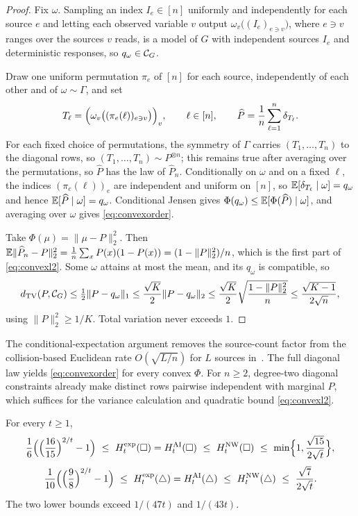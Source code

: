 \begin{proof}
Fix $\omega$. Sampling an index $I_e\in[n]$ uniformly and independently for each source $e$ and letting each observed variable $v$ output $\omega_v\bigl((I_e)_{e\ni v}\bigr)$, where $e\ni v$ ranges over the sources $v$ reads, is a model of $G$ with independent sources $I_e$ and deterministic responses, so $q_\omega\in\mathcal C_{G}$.

Draw one uniform permutation $\pi_e$ of $[n]$ for each source, independently of each other and of $\omega\sim\Gamma$, and set
\[
T_\ell=\Bigl(\omega_v\bigl((\pi_e(\ell))_{e\ni v}\bigr)\Bigr)_{v},\qquad \ell\in[n],
\qquad \widehat P=\frac1n\sum_{\ell=1}^n\delta_{T_\ell}.
\]
For each fixed choice of permutations, the symmetry of $\Gamma$ carries $(T_1,\dots,T_n)$ to the diagonal rows, so $(T_1,\dots,T_n)\sim P^{\otimes n}$; this remains true after averaging over the permutations, so $\widehat P$ has the law of $\widehat P_n$. Conditionally on $\omega$ and on a fixed $\ell$, the indices $(\pi_e(\ell))_e$ are independent and uniform on $[n]$, so $\mathbb E[\delta_{T_\ell}\mid\omega]=q_\omega$ and hence $\mathbb E[\widehat P\mid\omega]=q_\omega$. Conditional Jensen gives $\Phi(q_\omega)\le\mathbb E[\Phi(\widehat P)\mid\omega]$, and averaging over $\omega$ gives \eqref{eq:convexorder}.

Take $\Phi(\mu)=\|\mu-P\|_2^2$. Then $\mathbb E\|\widehat P_n-P\|_2^2=\frac1n\sum_xP(x)(1-P(x))=(1-\|P\|_2^2)/n$, which is the first part of \eqref{eq:convexl2}. Some $\omega$ attains at most the mean, and its $q_\omega$ is compatible, so
\[
d_{\operatorname{TV}}(P,\mathcal C_{G})\le\tfrac12\|P-q_\omega\|_1\le\frac{\sqrt K}2\|P-q_\omega\|_2\le\frac{\sqrt K}2\sqrt{\frac{1-\|P\|_2^2}n}\le\frac{\sqrt{K-1}}{2\sqrt n},
\]
using $\|P\|_2^2\ge1/K$. Total variation never exceeds $1$.
\end{proof}



The conditional-expectation argument removes the source-count factor from the collision-based Euclidean rate $O(\sqrt{L/n})$ for $L$ sources in~\cite[eqs.~(37) and (A7)]{NW2020}. The full diagonal law yields \eqref{eq:convexorder} for every convex $\Phi$. For $n\ge2$, degree-two diagonal constraints already make distinct rows pairwise independent with marginal $P$, which suffices for the variance calculation and quadratic bound \eqref{eq:convexl2}.

\FloatBarrier
\begin{corollary}\label{cor:brackets}\label{thm:brackets-intro}
For every $t\ge1$,
\[
\frac16\Bigl(\Bigl(\frac{16}{15}\Bigr)^{2/t}-1\Bigr)\ \le\ H^{\mathrm{exp}}_t(\square)=H^{\mathrm{AI}}_t(\square)\ \le\ H^{\mathrm{NW}}_t(\square)\ \le\ \min\Bigl\{1,\frac{\sqrt{15}}{2\sqrt t}\Bigr\},
\]
\[
\frac1{10}\Bigl(\Bigl(\frac98\Bigr)^{2/t}-1\Bigr)\ \le\ H^{\mathrm{exp}}_t(\triangle)=H^{\mathrm{AI}}_t(\triangle)\ \le\ H^{\mathrm{NW}}_t(\triangle)\ \le\ \frac{\sqrt7}{2\sqrt t}.
\]
The two lower bounds exceed $1/(47t)$ and $1/(43t)$.
\end{corollary}

